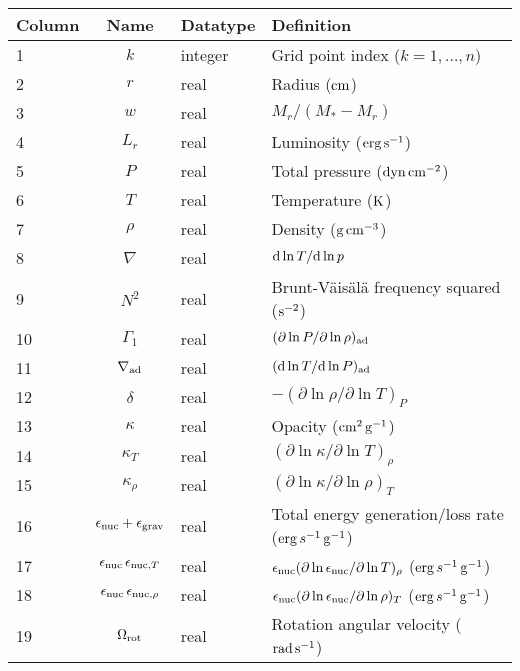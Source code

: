 \documentclass{article}
\newcommand{\diff}{\ensuremath{{\rm d}}}
\newcommand{\Mstar}{\ensuremath{M_{\ast}}}
\newcommand{\cm}{\ensuremath{{\rm cm}}}
\newcommand{\gram}{\ensuremath{{\rm g}}}
\newcommand{\second}{\ensuremath{{\rm s}}}
\newcommand{\dyne}{\ensuremath{{\rm dyn}}}
\newcommand{\erg}{\ensuremath{{\rm erg}}}
\newcommand{\kelvin}{\ensuremath{{\rm K}}}
\begin{document}
\begin{table}[h!]
\begin{tabular}{|l|c|l|l|} \hline
Column & Name & Datatype & Definition \\ \hline
1      & $k$ & integer & Grid point index ($k=1,\ldots,n$) \\
2      & $r$ & real    & Radius ($\cm$) \\
3      & $w$ & real    & $M_{r}/(\Mstar-M_{r})$ \\
4      & $L_{r}$ & real & Luminosity ($\erg\,\second^{-1}$) \\
5      & $P$ & real    & Total pressure ($\dyne\,\cm^{-2}$) \\
6      & $T$ & real    & Temperature ($\kelvin$) \\
7      & $\rho$ & real & Density ($\gram\,\cm^{-3}$) \\
8      & $\nabla$ & real & $\diff \ln T/\diff \ln p$ \\
9      & $N^{2}$ & real & Brunt-V\"ais\"al\"a frequency squared ($\second^{-2}$) \\
10     & $\Gamma_{1}$ & real & $(\partial \ln P/\partial \ln \rho)_{\rm ad}$ \\
11     & $\nabla_{\rm ad}$ & real & $(\diff \ln T/\diff \ln P)_{\rm ad}$ \\
12     & $\delta$ & real & $-(\partial \ln \rho/\partial \ln T)_{P}$  \\
13     & $\kappa$ & real & Opacity ($\cm^{2}\,\gram^{-1}$) \\
14     & $\kappa_{T}$ & real & $(\partial \ln \kappa/\partial \ln T)_{\rho}$ \\
15     & $\kappa_{\rho}$ & real & $(\partial \ln \kappa/\partial \ln \rho)_{T}$ \\
16     & $\epsilon_{\rm nuc} + \epsilon_{\rm grav}$ & real & Total energy generation/loss rate ($\erg\,s^{-1}\,\gram^{-1}$) \\
17     & $\epsilon_{\rm nuc}\,\epsilon_{{\rm nuc},T}$ & real & $\epsilon_{\rm nuc} (\partial \ln \epsilon_{\rm nuc}/\partial \ln T)_{\rho}$ ($\erg\,s^{-1}\,\gram^{-1}$) \\
18     & $\epsilon_{\rm nuc}\,\epsilon_{{\rm nuc},\rho}$ & real & $\epsilon_{\rm nuc} (\partial \ln \epsilon_{\rm nuc}/\partial \ln \rho)_{T}$ ($\erg\,s^{-1}\,\gram^{-1}$) \\
19     & $\Omega_{\rm rot}$ & real & Rotation angular velocity (${\rm rad}\,\second^{-1}$) \\  \hline
\end{tabular}
\end{table}
\end{document}
